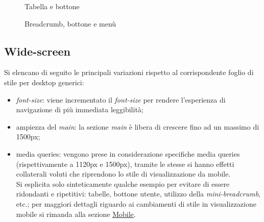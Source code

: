\documentclass{article}
\begin{document}
\begin{figure}[H]
	\centering
	\caption{Tabella e bottone}
\end{figure}

\begin{figure}[H]
	\centering
	\caption{Breadcrumb, bottone e menù}
\end{figure}

\newpage
\subsection{Wide-screen}
Si elencano di seguito le principali variazioni rispetto al corrispondente foglio di stile per desktop generici:
\begin{itemize}
	\item\textit{font-size}: viene incrementato il \textit{font-size} per rendere l'esperienza di navigazione di più immediata leggibilità;
	\item ampiezza del \textit{main}: la sezione \textit{main} è libera di crescere fino ad un massimo di 1500px;
	\item media queries: vengono prese in considerazione specifiche media queries (rispettivamente a 1120px e 1500px), tramite le stesse si hanno effetti collaterali voluti che riprendono lo stile di visualizzazione da mobile.\\
	Si esplicita solo sinteticamente qualche esempio per evitare di essere ridondanti e ripetitivi:  tabelle, bottone utente, utilizzo della \textit{mini-breadcrumb}, etc.; per maggiori dettagli riguardo ai cambiamenti di stile in visualizzazione mobile si rimanda alla sezione \hyperref[presentazione:mobile]{\underline{Mobile}}.
\end{itemize}
\end{document}
